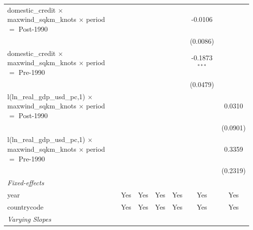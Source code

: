 \begin{tabular}{lcccccc}
   domestic\_credit $\times$ maxwind\_sqkm\_knots $\times$ period $=$ Post-1990                    &               &                         &                 &          & -0.0106                 &   \\   
                                                                                                   &               &                         &                 &          & (0.0086)                &   \\   
   domestic\_credit $\times$ maxwind\_sqkm\_knots $\times$ period $=$ Pre-1990                     &               &                         &                 &          & -0.1873$^{***}$         &   \\   
                                                                                                   &               &                         &                 &          & (0.0479)                &   \\   
   l(ln\_real\_gdp\_usd\_pc,1) $\times$ maxwind\_sqkm\_knots $\times$ period $=$ Post-1990         &               &                         &                 &          &                         & 0.0310\\   
                                                                                                   &               &                         &                 &          &                         & (0.0901)\\   
   l(ln\_real\_gdp\_usd\_pc,1) $\times$ maxwind\_sqkm\_knots $\times$ period $=$ Pre-1990          &               &                         &                 &          &                         & 0.3359\\   
                                                                                                   &               &                         &                 &          &                         & (0.2319)\\   
   \midrule
   \emph{Fixed-effects}\\
   year                                                                                            & Yes           & Yes                     & Yes             & Yes      & Yes                     & Yes\\  
   countrycode                                                                                     & Yes           & Yes                     & Yes             & Yes      & Yes                     & Yes\\  
   \midrule
   \emph{Varying Slopes}\\

\end{tabular}

